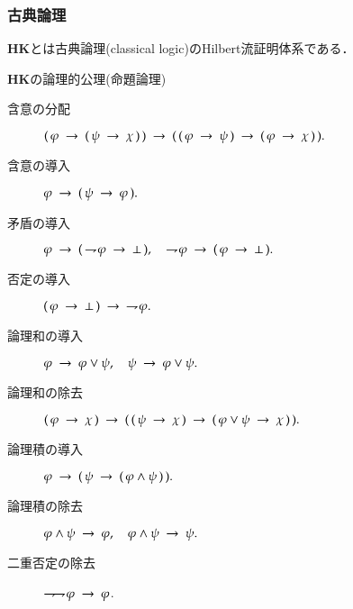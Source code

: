 \documentclass[dvipdfmx,10pt,notheorems]{beamer}
\theoremstyle{definition}
\newcommand{\negation}{\rightharpoondown\hspace{-0.25em}} %
\newcommand{\rarrow}{\hspace{0.25em}\rightarrow\hspace{0.25em}} %
\begin{document}
\begin{frame}\frametitle{古典論理}
	{\bf HK}とは古典論理(classical logic)のHilbert流証明体系である．
	\begin{alertblock}{{\bf HK}の論理的公理(命題論理)}
		\begin{description}
			\item[含意の分配] $(\, \varphi \rarrow (\, \psi \rarrow \chi\, )\, ) 
				\rarrow (\, (\, \varphi \rarrow \psi\, )
				\rarrow (\, \varphi \rarrow \chi\, )\, ).$
			\item[含意の導入] $\varphi \rarrow (\, \psi \rarrow \varphi\, ).$
			\item[矛盾の導入] $\varphi \rarrow (\, \negation \varphi \rarrow \bot\, ),
				\quad \negation \varphi \rarrow (\, \varphi \rarrow \bot\, ).$
			\item[否定の導入] $(\, \varphi \rarrow \bot\, ) \rarrow\ \negation \varphi.$
			\item[論理和の導入] $\varphi \rarrow \varphi \vee \psi,
				\quad \psi \rarrow \varphi \vee \psi.$
			\item[論理和の除去] $(\, \varphi \rarrow \chi\, ) \rarrow 
					(\, (\, \psi \rarrow \chi\, ) 
					\rarrow (\, \varphi \vee \psi \rarrow \chi\, )\, ).$
			\item[論理積の導入] $\varphi \rarrow (\, \psi \rarrow (\, \varphi \wedge \psi\, )\, ).$
			\item[論理積の除去] $\varphi \wedge \psi \rarrow \varphi,
				\quad \varphi \wedge \psi \rarrow \psi.$
			\item[二重否定の除去] $\negation \negation \varphi \rarrow \varphi$.
		\end{description}
	\end{alertblock}
\end{frame}
\end{document}
